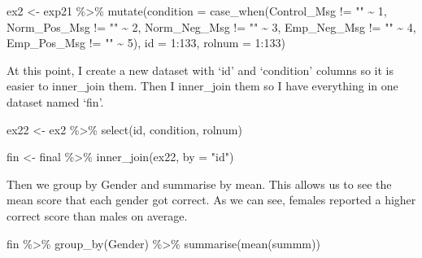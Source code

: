 \documentclass[
]{article}
\newenvironment{Shaded}{\begin{snugshade}}{\end{snugshade}}
\newcommand{\AttributeTok}[1]{\textcolor[rgb]{0.77,0.63,0.00}{#1}}
\newcommand{\DecValTok}[1]{\textcolor[rgb]{0.00,0.00,0.81}{#1}}
\newcommand{\FunctionTok}[1]{\textcolor[rgb]{0.00,0.00,0.00}{#1}}
\newcommand{\NormalTok}[1]{#1}
\newcommand{\OtherTok}[1]{\textcolor[rgb]{0.56,0.35,0.01}{#1}}
\newcommand{\SpecialCharTok}[1]{\textcolor[rgb]{0.00,0.00,0.00}{#1}}
\newcommand{\StringTok}[1]{\textcolor[rgb]{0.31,0.60,0.02}{#1}}
\begin{document}
\begin{enumerate}
\begin{Shaded}
\begin{Highlighting}[]
\NormalTok{ex2 }\OtherTok{\textless{}{-}}\NormalTok{ exp21 }\SpecialCharTok{\%\textgreater{}\%}
         \FunctionTok{mutate}\NormalTok{(}\AttributeTok{condition =} \FunctionTok{case\_when}\NormalTok{(Control\_Msg }\SpecialCharTok{!=} \StringTok{""} \SpecialCharTok{\textasciitilde{}} \DecValTok{1}\NormalTok{,}
\NormalTok{                               Norm\_Pos\_Msg }\SpecialCharTok{!=} \StringTok{""} \SpecialCharTok{\textasciitilde{}} \DecValTok{2}\NormalTok{,}
\NormalTok{                               Norm\_Neg\_Msg }\SpecialCharTok{!=} \StringTok{""} \SpecialCharTok{\textasciitilde{}} \DecValTok{3}\NormalTok{,}
\NormalTok{                               Emp\_Neg\_Msg }\SpecialCharTok{!=} \StringTok{""} \SpecialCharTok{\textasciitilde{}} \DecValTok{4}\NormalTok{,}
\NormalTok{                               Emp\_Pos\_Msg }\SpecialCharTok{!=} \StringTok{""} \SpecialCharTok{\textasciitilde{}} \DecValTok{5}\NormalTok{),}
                \AttributeTok{id =} \DecValTok{1}\SpecialCharTok{:}\DecValTok{133}\NormalTok{,}
                \AttributeTok{rolnum =} \DecValTok{1}\SpecialCharTok{:}\DecValTok{133}\NormalTok{) }
\end{Highlighting}
\end{Shaded}

  At this point, I create a new dataset with `id' and `condition'
  columns so it is easier to inner\_join them. Then I inner\_join them
  so I have everything in one dataset named `fin'.

\begin{Shaded}
\begin{Highlighting}[]
\NormalTok{ex22 }\OtherTok{\textless{}{-}}\NormalTok{ ex2 }\SpecialCharTok{\%\textgreater{}\%} \FunctionTok{select}\NormalTok{(id, condition, rolnum)}

\NormalTok{fin }\OtherTok{\textless{}{-}}\NormalTok{ final }\SpecialCharTok{\%\textgreater{}\%} \FunctionTok{inner\_join}\NormalTok{(ex22, }\AttributeTok{by =} \StringTok{"id"}\NormalTok{)}
\end{Highlighting}
\end{Shaded}

  Then we group by Gender and summarise by mean. This allows us to see
  the mean score that each gender got correct. As we can see, females
  reported a higher correct score than males on average.

\begin{Shaded}
\begin{Highlighting}[]
\NormalTok{fin }\SpecialCharTok{\%\textgreater{}\%} \FunctionTok{group\_by}\NormalTok{(Gender) }\SpecialCharTok{\%\textgreater{}\%} \FunctionTok{summarise}\NormalTok{(}\FunctionTok{mean}\NormalTok{(summm))}
\end{Highlighting}
\end{Shaded}


\end{enumerate}
\end{document}
